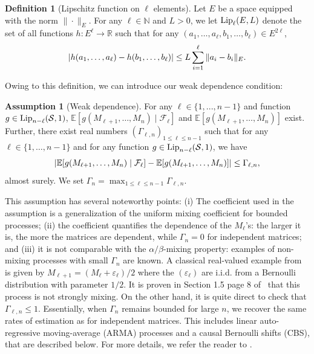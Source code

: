 \documentclass[11pt,a4paper]{article}
\theoremstyle{remark}
\theoremstyle{definition}
\newtheorem{definition}{Definition}
\newtheorem{assumption}{Assumption}
\theoremstyle{definition}
\DeclarePairedDelimiter{\abs}{\lvert}{\rvert}
\newcommand{\rc}{\color{black}}
\begin{document}
\begin{bibunit}[apalike]
\begin{definition}[Lipschitz function on $\ell$ elements]
Let $E$ be a space equipped with the norm $\|\cdot\|_E$. For any $\ell\in\mathbb{N}$ and $L > 0$, we let ${\rm Lip}_{\ell}(E,L)$ denote the set of all functions $h:E^{\ell}\rightarrow \mathbb{R}$ such that for any $(a_1,\dots,a_{\ell},b_1,\dots,b_\ell)\in E^{2\ell}$,
$$ \abs{ h(a_1,\dots,a_{\ell}) - h(b_1,\dots,b_{\ell}) } \leq L \sum_{i=1}^{\ell} \|a_i - b_i\|_{E} . $$
\end{definition}
Owing to this definition, we can introduce our weak dependence condition:
\begin{assumption}[Weak dependence]
\label{asm:weakdep}
{\rc 
For any $\ell \in \{1,...,n-1\}$ and function $g\in {\rm Lip}_{n-\ell}(\mathcal{S},1)$,  $\mathbb{E}[g(M_{\ell+1},\dots,M_n) \mid \mathcal{F}_\ell]$ and $\mathbb{E}[g(M_{\ell+1},\dots,M_n)]$ exist. }
Further, there exist real numbers $(\Gamma_{\ell,n})_{1\leq \ell \leq n-1}$ such that for any $\ell\in\{1,\dots,n-1\}$ and for any function $g\in {\rm Lip}_{n-\ell}(\mathcal{S},1)$, we have
\begin{equation}
\label{eq:asm:weakdep}
\abs{ \mathbb{E}[g(M_{\ell+1},\dots,M_n) \mid \mathcal{F}_\ell] - \mathbb{E}[g(M_{\ell+1},\dots,M_n)] } \leq \Gamma_{\ell,n},
\end{equation}
almost surely. We set $\Gamma_n = \max_{1\leq \ell \leq n-1} \Gamma_{\ell,n}$.
\end{assumption}

This assumption has several noteworthy points:
(i) The coefficient used in the assumption is a generalization of the uniform mixing coefficient for bounded processes; (ii) the coefficient quantifies the dependence of the $M_\ell$'s: the larger it is, the more the matrices are dependent, while $\Gamma_n=0$ for independent matrices; and (iii) it is not comparable with the $\alpha/\beta$-mixing property: examples of non-mixing processes with small $\Gamma_n$ are known. {\rc A classical real-valued example from~\citep{andrews1984non} is given by $
M_{\ell+1} = (M_{\ell}+\varepsilon_{\ell})/2 $ where the $(\varepsilon_\ell)$ are i.i.d. from a Bernoulli distribution with parameter $1/2$. It is proven in Section 1.5 page 8 of~\citep{dedecker2007weak} that this process is not strongly mixing. On the other hand, it is quite direct to check that $\Gamma_{\ell,n} \leq 1 $.}
Essentially, when $\Gamma_n$ remains bounded for large $n$, we recover the same rates of estimation as for independent matrices.
This includes linear auto-regressive moving-average (ARMA) processes and a causal Bernoulli shifts (CBS), that are described below.
For more details, we refer the reader to \citep{rio2000inegalites,dedecker2005new,dedecker2007weak,alquier2012model}. %



\end{bibunit}
\end{document}
